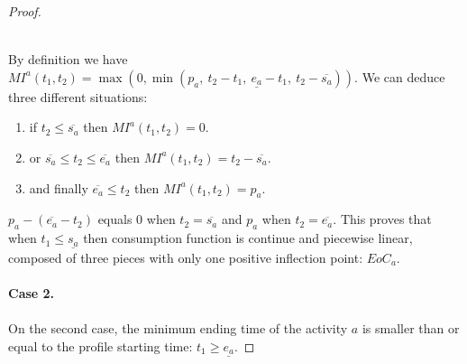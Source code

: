 \documentclass{llncs}
\newcommand \MI[3]{MI^{#3}(#1,#2) }
\newcommand \DOI[1]{EoC_{#1}}
\begin{document}
{\begin{proof}
\begin{minipage}{0.45\textwidth}
\label{Fig:case1}
\end{minipage}\\
By definition we have $ \MI{t_1}{t_2}{a} = \max\left(0,\min\left(p_a,~t_2\!-\!t_1,~\underline{e_a} \!-\! t_1,~t_2\!-\!\overline{s_a}\right)\right)$.
We can deduce three different situations:

\begin{enumerate}
\item if $t_2 \le \overline{s_a}$ then $ \MI{t_1}{t_2}{a}= 0$.
\item or $\overline{s_a}\le t_2 \le \overline{e_a}$ then $\MI{t_1}{t_2}{a}=  t_2 - \overline{s_a}$.
\item and finally $ \overline{e_a} \le t_2$ then $\MI{t_1}{t_2}{a} = p_a$.
\end{enumerate}

\noindent $p_a \!-\! (\overline{e_a} \!-\! t_2)$ equals $0$ when $t_2 = \overline{s_a}$ and $p_a$ when $t_2 = \overline{e_a}$.
This proves that when $t_1 \le \underline{s_a} $ then consumption function is continue and piecewise linear, composed of three pieces with only one positive inflection point: $\DOI{a}$. 


\paragraph{Case 2.}
\paragraph{}
\hspace{-0.15cm}\begin{minipage}{0.45\textwidth} 
On the second case, the minimum ending time of the activity $a$ is smaller than or equal to the profile starting time:
$t_1 \ge \underline{e_a} $.
\end{minipage}
\begin{minipage}{0.45\textwidth} 
   \hspace{0.5cm}
\end{minipage}
\end{proof}}
\end{document}
